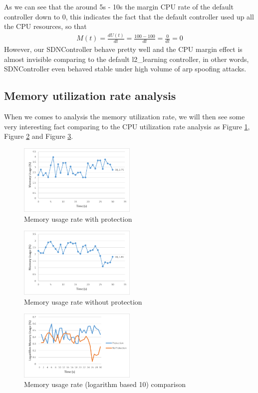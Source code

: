\documentclass[conference]{IEEEtran}
\begin{document}
As we can see that the around 5s - 10s the margin CPU rate of the default controller down to $0$, this indicates the fact that the default controller used up all the CPU resources, so that 
\begin{align}
     M(t) = \frac{dU(t)}{dt}=\frac{100-100}{dt}=\frac{0}{dt}=0
\end{align}
However, our SDNController behave pretty well and the CPU margin effect is almost invisible comparing to the default l2\_learning controller, in other words, SDNController even behaved stable under high volume of arp spoofing attacks. 

\subsection{Memory utilization rate analysis}
When we comes to analysis the memory utilization rate, we will then see some very interesting fact comparing to the CPU utilization rate analysis as Figure \ref{fig:MemwProtect}, Figure \ref{fig:MemwoProtect} and Figure \ref{fig:MemComparison}.

\begin{figure}[h!]
\includegraphics[width=0.5\textwidth]{MemwProtect.png}
\caption{Memory usage rate with protection}
\label{fig:MemwProtect}
\end{figure}

\begin{figure}[h!]
\includegraphics[width=0.5\textwidth]{MemwoProtect.png}
\caption{Memory usage rate without protection}
\label{fig:MemwoProtect}
\end{figure}

\begin{figure}[h!]
\includegraphics[width=0.5\textwidth]{MemComparison.png}
\caption{Memory usage rate (logarithm based 10) comparison}
\label{fig:MemComparison}
\end{figure}
\end{document}
